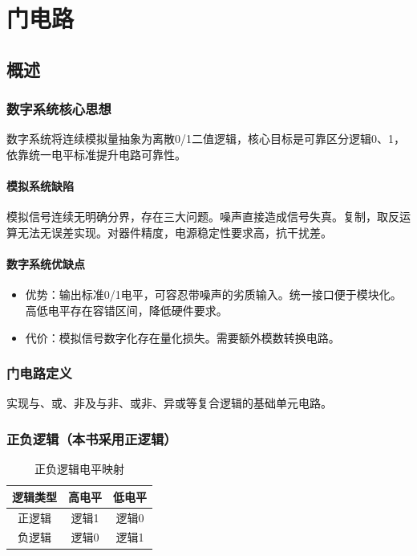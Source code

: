\chapter{门电路}
\setlength{\parskip}{0.4em}
\setlength{\itemsep}{0.2em}
\setlength{\tabcolsep}{4pt} %

\section{概述}
\subsection{数字系统核心思想}
数字系统将连续模拟量抽象为离散0/1二值逻辑，核心目标是可靠区分逻辑0、1，依靠统一电平标准提升电路可靠性。

\subsubsection{模拟系统缺陷}
模拟信号连续无明确分界，存在三大问题。噪声直接造成信号失真。复制，取反运算无法无误差实现。对器件精度，电源稳定性要求高，抗干扰差。

\subsubsection{数字系统优缺点}
\begin{itemize}
    \item 优势：输出标准0/1电平，可容忍带噪声的劣质输入。统一接口便于模块化。高低电平存在容错区间，降低硬件要求。
    \item 代价：模拟信号数字化存在量化损失。需要额外模数转换电路。
\end{itemize}

\subsection{门电路定义}
实现与、或、非及与非、或非、异或等复合逻辑的基础单元电路。

\subsection{正负逻辑（本书采用正逻辑）}
\begin{table}[htbp]
    \centering
    \caption{正负逻辑电平映射}
    \begin{tabular}{|c|c|c|}
        \hline
        逻辑类型 & 高电平 & 低电平 \\
        \hline
        正逻辑 & 逻辑1 & 逻辑0 \\
        \hline
        负逻辑 & 逻辑0 & 逻辑1 \\
        \hline
    \end{tabular}
\end{table}

